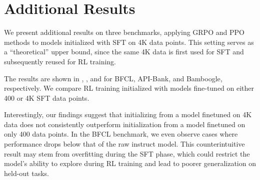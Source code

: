 


\section{Additional Results}

We present additional results on three benchmarks, applying GRPO and PPO methods to models initialized with SFT on 4K data points. This setting serves as a ``theoretical'' upper bound, since the same 4K data is first used for SFT and subsequently reused for RL training.



The results are shown in , , and  for BFCL, API-Bank, and Bamboogle, respectively. We compare RL training initialized with models fine-tuned on either 400 or 4K SFT data points.

Interestingly, our findings suggest that initializing from a model finetuned on 4K data does not consistently outperform initialization from a model finetuned on only 400 data points. In the BFCL benchmark, we even observe cases where performance drops below that of the raw instruct model. This counterintuitive result may stem from overfitting during the SFT phase, which could restrict the model’s ability to explore during RL training and lead to poorer generalization on held-out tasks.

